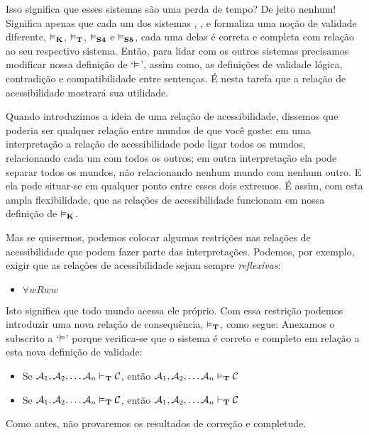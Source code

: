 Isso significa que esses sistemas são uma perda de tempo? De jeito nenhum! Significa apenas que cada um dos sistemas \mlK{}, \mlT, \mlSfour{}  e \mlSfive{} formaliza uma noção de validade diferente, $\vDash_{\mathbf{K}}$, $\vDash_{\mathbf{T}}$, $\vDash_{\mathbf{S4}}$ e $\vDash_{\mathbf{S5}}$, cada uma delas é correta e completa com relação ao seu respectivo sistema. Então, para lidar com os outros sistemas precisamos modificar nossa definição de `$\vDash$', assim como, as definições de validade lógica, contradição e compatibilidade entre sentenças.  
É nesta tarefa que a  relação de acessibilidade mostrará sua utilidade.  

Quando introduzimos a ideia de uma relação de acessibilidade, dissemos que poderia ser qualquer relação entre mundos de que você goste:  em uma interpretação a relação de acessibilidade pode ligar todos os mundos, relacionando cada um com todos os outros; em outra interpretação ela pode separar todos os mundos, não relacionando nenhum mundo com nenhum outro. E ela pode situar-se em qualquer ponto entre esses dois extremos. É assim, com esta ampla flexibilidade, que as relações de acessibilidade funcionam em nossa definição de $\vDash_{\mathbf{K}}$. 

Mas se quisermos, podemos colocar algumas restrições nas relações de acessibilidade que podem fazer parte das interpretações. Podemos, por exemplo, exigir que as relações de acessibilidade sejam sempre \emph{reflexivas}:

\begin{itemize}
	\item $\forall wRww$
\end{itemize}
Isto significa que todo mundo acessa ele próprio.  Com   essa restrição podemos introduzir uma nova relação de consequência, $\vDash_{\mathbf{T}}$, como segue:
Anexamos o subscrito \mlT{}  a `$\vDash$' porque verifica-se que o sistema \mlT{} é correto e completo em relação a esta nova definição de validade:
\begin{itemize}
	\item Se $\mathcal{A}_1,\mathcal{A}_2, \dots \mathcal{A}_n\vdash_{\mathbf{T}}\mathcal{C}$, então $\mathcal{A}_1,\mathcal{A}_2, \dots \mathcal{A}_n\vDash_{\mathbf{T}}\mathcal{C}$
	\item Se $\mathcal{A}_1,\mathcal{A}_2, \dots \mathcal{A}_n\vDash_{\mathbf{T}}\mathcal{C}$, então $\mathcal{A}_1,\mathcal{A}_2, \dots \mathcal{A}_n\vdash_{\mathbf{T}}\mathcal{C}$
\end{itemize}
Como antes, não provaremos os resultados de correção e completude. 

